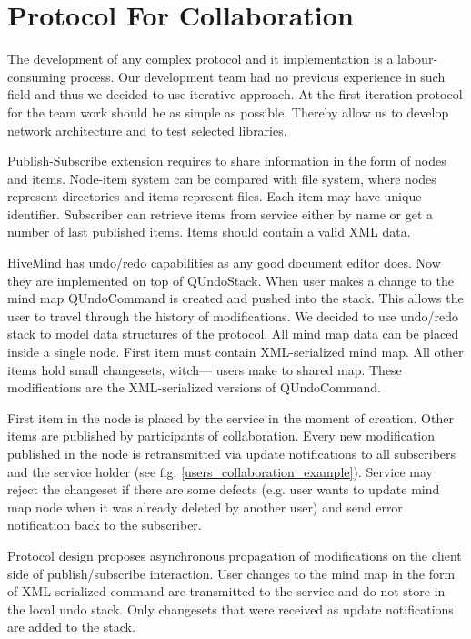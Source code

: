 \section{Protocol For Collaboration}

 The development of any complex protocol and it implementation is a
 labour-consuming process. Our development team had no previous experience in
 such field and thus we decided to use iterative approach. At the first iteration
 protocol for the team work should be as simple as possible. Thereby allow us to
 develop network architecture and to test selected libraries.

 Publish-Subscribe extension requires to share information in the form of nodes
 and items. Node-item system can be compared with file system, where nodes
 represent directories and items represent files. Each item may have unique
 identifier. Subscriber can retrieve items from service either by name or get a
 number of last published items. Items should contain a valid XML data.

 HiveMind has undo/redo capabilities as any good document editor does. Now they
 are implemented on top of QUndoStack. When user makes a change to the mind map
 QUndoCommand is created and pushed into the stack. This allows the user to
 travel through the history of modifications. We decided to use undo/redo stack
 to model data structures of the protocol. All mind map data can be placed
 inside a single node. First item must contain XML-serialized mind map. All other
 items hold small changesets, witch--- users make to shared map. These
 modifications are the XML-serialized versions of QUndoCommand.

 First item in the node is placed by the service in the moment of creation. Other
 items are published by participants of collaboration. Every new modification
 published in the node is retransmitted via update notifications to all
 subscribers and the service holder (see fig. \ref{users_collaboration_example}). 
 Service may reject the changeset if there are some defects (e.g. user wants to 
 update mind map node when it was already deleted by another user) and send error
 notification back to the subscriber.

 Protocol design proposes asynchronous propagation of modifications on the client
 side of publish/subscribe interaction. User changes to the mind map in the form
 of XML-serialized command are transmitted to the service and do not store in
 the local undo stack. Only changesets that were received as update notifications
 are added to the stack.

